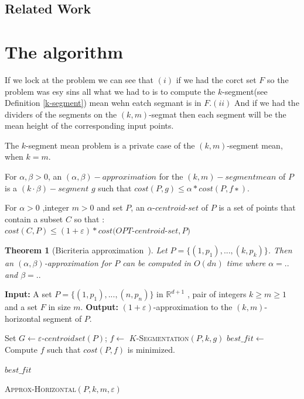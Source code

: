 \documentclass{vldb}
\begin{document}
\subsection{Related Work}

\section{The algorithm}
If we lock at the problem we can see that $(i)$ if we had the corct set $F$
so the problem was esy sins all what we had to is to compute the $k$-segment(see Definition \ref{k-segment}) mean wehn eatch segmant is in $F$.$(ii)$ And if we had the dividers of the segments on the $(k,m)$-segmat then each segment
will be the mean height of the corresponding input points. 

\begin{definition} \label{k-segment}
The $k$-segment mean problem is a private case of the $(k,m)$-segment mean, when $k = m$.

\end{definition}


\begin{definition}
For $ \alpha, \beta > 0$, an $(\alpha, \beta)-approximation$ for the $(k,m)-segment mean$
 of $P$ is a $(k · β)-segment$ $ g$ such that $cost(P, g) \leq \alpha \ast cost(P, f ∗).$

\end{definition}
\begin{definition}
For $ \alpha > 0$ ,integer $m>0$ and set $P$, an $\alpha$-$centroid$-$set$ of $P$ is a set of points that contain a subset $C$ so that : \\ $cost(C,P)\leq (1+\varepsilon)*cost(OPT$-$centroid$-$set,P)$ 

\end{definition}
\newtheorem{theorem}{Theorem}
\begin{theorem}[Bicriteria approximation~\cite{FL11}]
Let $P=\lbrace(1, p_1),...,(k, p_k)\rbrace$. Then an $(\alpha,\beta)$-approximation for $P$ can be computed in $O(dn)$ time where $\alpha=..$ and $\beta=..$

\end{theorem}
\begin{algorithm}
\begin{algorithmic}
\STATE \textbf{Input:} A set $P = \lbrace(1,p_1),...,(n,p_n)\rbrace$ in $ \mathbb{R}^{d+1}$
, pair of integers $k\geq m\geq1$
and a set $F$ in size $m$.
\STATE \textbf{Output:}  $(1+\varepsilon)$-approximation to the $(k,m)$-horizontal segment of $P$.

Set $G\gets \varepsilon$-$centroidset(P)$;
\STATE 
$f \gets $ \textsc{$K$-Segmentation$(P,k,g)$}
\STATE $best\_fit \gets $ Compute $f$ such that $cost(P,f)$ is minimized.

\ENDFOR

\RETURN $best\_fit$

\caption{\textsc{Approx-Horizontal$(P,k,m,\varepsilon)$}}

\end{algorithmic}
\end{algorithm}
\end{document}
